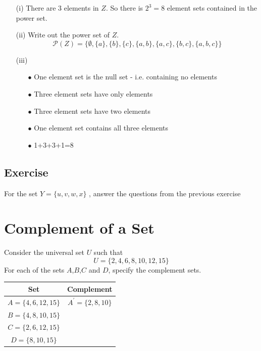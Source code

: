 \documentclass[]{report}
\begin{document}
\begin{enumerate}
\begin{itemize}


\item[(i)] There are 3 elements in $Z$. So there is $2^3 = 8$ element sets contained in the power set.

\item[(ii)] Write out the power set of $Z$.
\[ \mathcal{P}(Z) = \{ \emptyset, \{a\}, \{b\}, \{c\}, \{a,b\}, \{a,c\}, \{b,c\}, \{a,b,c\} \} \]

\item[(iii)]
\begin{itemize}
\item[$\bullet$] One element set is the null set - i.e. containing no
elements \item[$\bullet$] Three element sets have only elements \item[$\bullet$]
Three element sets have two elements \item[$\bullet$] One element set
contains all three elements \item[$\bullet$] 1+3+3+1=8
\end{itemize}
\end{itemize}
\subsection*{Exercise}
For the set $Y = \{u,v,w,x\}$ , answer the questions from the
previous exercise



\section*{Complement of a Set}
Consider the universal set $U$ such that
\[U=\{2,4,6,8,10,12,15\} \]
For each of the sets $A$,$B$,$C$ and $D$, specify the complement sets.
{

\begin{center}
\begin{tabular}{|c|c|}
\hline
Set &\phantom{sp} Complement \phantom{sp}\\
\hline \phantom{sp} $A=\{4,6,12,15\}$ \phantom{sp} &
$A^{\prime}=\{2,8,10\}$ \\ \hline $B=\{4,8,10,15\}$ & \\ \hline
$C=\{2,6,12,15\}$ & \\ \hline $D=\{8,10,15\}$ & \\ \hline

\end{tabular}
\end{center}
}


\end{enumerate}
\end{document}
